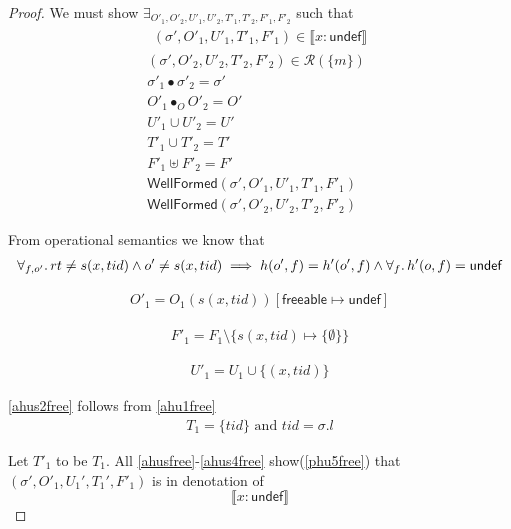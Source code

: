 \begin{proof}
We must show $\exists_{O'_{1}, O'_{2}, U'_{1}, U'_{2}, T'_{1}, T'_{2},F'_1, F'_2}$ such that
\begin{gather}\label{phu5free}
\begin{aligned}
(\sigma',O'_{1},U'_{1}, T'_{1},F'_1)  \in \llbracket  x:\textsf{undef}  \rrbracket 
\end{aligned}\\
\label{phu6free}
(\sigma',O'_{2},U'_{2}, T'_{2},F'_2) \in \mathcal{R}(\{m\})
\\
\label{phufreesig}
\sigma'_1 \bullet \sigma'_2 = \sigma'
\\
\label{phu7free}
O'_{1} \bullet_{O} O'_{2} = O'
\\
\label{phu8free}
U'_{1} \cup U'_{2} = U'
\\
\label{phu9free}
T'_{1} \cup T'_{2} = T'
\\
\label{phufreeF}
F'_1 \uplus F'_2 = F'
\\
\label{phu10free}
\textsf{WellFormed}(\sigma',O'_{1},U'_{1},T'_{1},F'_1) \\
\label{phu11free}
\textsf{WellFormed}(\sigma',O'_{2},U'_{2},T'_{2},F'_2)
\end{gather}

From operational semantics we know that
\begin{gather}\label{ahusfree}
  \forall_{f,o'}\ldotp rt \neq s(x,tid) \land  o' \neq s(x,tid) \implies h(o',f) = h'(o',f) \land \forall_{f}\ldotp h'(o,f)=\textsf{undef}
\end{gather}

\begin{gather}\label{ahus1free}
  O'_1 =  O_1(s(x,tid))[\textsf{freeable}\mapsto \textsf{undef}]
\end{gather}

\begin{gather}\label{ahus3free}
  F'_1 = F_1 \setminus \{s(x,tid)\mapsto \{\emptyset\}\}
  \end{gather}

\begin{gather}\label{ahus4free}
  U'_1 = U_1 \cup \{(x,tid)\}
  \end{gather}

\ref{ahus2free} follows from \ref{ahu1free}
\begin{gather}\label{ahus2free}
  T_1 = \{tid\} \text{ and } tid = \sigma.l
\end{gather}

Let $T'_1$ to be $T_1$. All \ref{ahusfree}-\ref{ahus4free} show(\ref{phu5free}) that $(\sigma',O'_1,U_1',T_1',F'_1)$ is in denotation of  
\[\llbracket  x:\textsf{undef}  \rrbracket \]


\end{proof}
